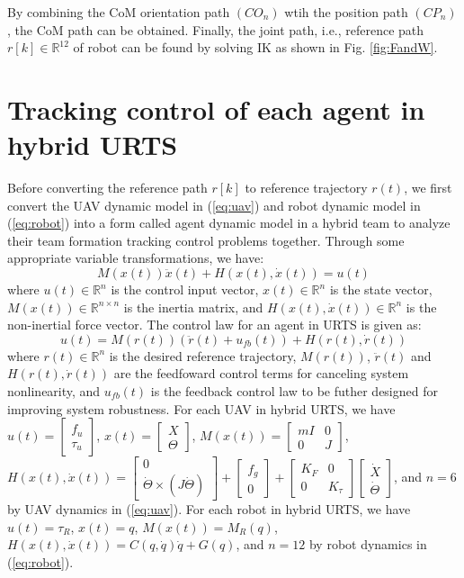 \documentclass{ieeeaccess}
\begin{document}
By combining the CoM orientation path $(CO_n)$ wtih the position path $(CP_n)$, the CoM path can be obtained. Finally, the joint path, i.e., reference path $r[k]\in\mathbb{R}^{12}$ of robot can be found by solving IK as shown in Fig. \ref{fig:FandW}.

\section{Tracking control of each agent in hybrid URTS}
Before converting the reference path $r[k]$ to reference trajectory $r(t)$, we first convert the UAV dynamic model in (\ref{eq:uav}) and robot dynamic model in (\ref{eq:robot}) into a form called agent dynamic model in a hybrid team to analyze their team formation tracking control problems together. Through some appropriate variable transformations, we have:
\begin{equation} \label{eq:agent} 
    M(x(t))\ddot{x}(t) + H(x(t),\dot{x}(t)) = u(t)
\end{equation}
where $u(t)\in\mathbb{R}^n$ is the control input vector, $x(t)\in\mathbb{R}^n$ is the state vector, $M(x(t))\in\mathbb{R}^{n\times n}$ is the inertia matrix, and $H(x(t),\dot{x}(t))\in\mathbb{R}^n$ is the non-inertial force vector. The control law for an agent in URTS is given as:
\begin{equation} \label{eq:control}
    u(t)= M(r(t))(\ddot{r}(t) + u_{fb}(t)) + H(r(t),\dot{r}(t)) 
\end{equation}
where $r(t)\in\mathbb{R}^n$ is the desired reference trajectory, $M(r(t))$, $\ddot{r}(t)$ and $H(r(t), \dot{r}(t))$ are the feedfoward control terms for canceling system nonlinearity, and $u_{fb}(t)$ is the feedback control law to be futher designed for improving system robustness. For each UAV in hybrid URTS, we have $u(t)=\begin{bmatrix}
    f_u \\ \tau_u
\end{bmatrix}$, $x(t)=\begin{bmatrix}
    X \\ \Theta
\end{bmatrix}$, $M(x(t))=\begin{bmatrix}
    mI & 0 \\ 0 & J
\end{bmatrix}$, $H(x(t),\dot{x}(t))=\begin{bmatrix}
    0 \\ \dot{\Theta}\times(J\dot{\Theta})
\end{bmatrix}+\begin{bmatrix}
    f_g \\ 0
\end{bmatrix}+\begin{bmatrix}
    K_F & 0 \\
    0 & K_\tau
\end{bmatrix}\begin{bmatrix}
    \dot{X} \\ \dot{\Theta}
\end{bmatrix}$, and $n=6$ by UAV dynamics in (\ref{eq:uav}). For each robot in hybrid URTS, we have $u(t)=\tau_R$, $x(t)=q$, $M(x(t))=M_R(q)$, $H(x(t),\dot{x}(t))=C(q,\dot{q})\dot{q} + G(q)$, and $n=12$ by robot dynamics in (\ref{eq:robot}).
\end{document}
